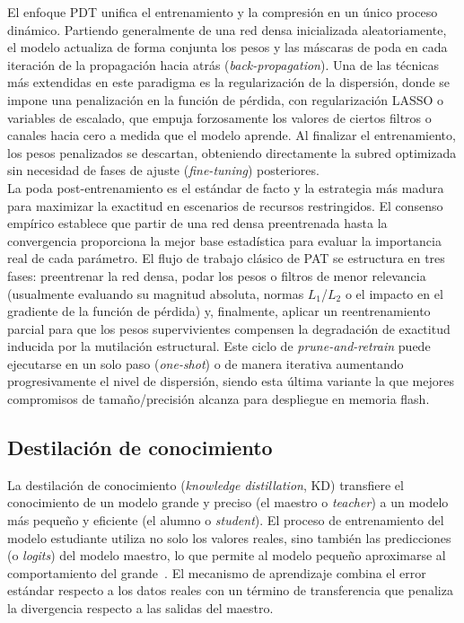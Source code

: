 \documentclass[a4paper,12pt,twoside,final]{book}
\begin{document}
El enfoque PDT unifica el entrenamiento y la compresión en un único proceso dinámico. Partiendo generalmente de una
red densa inicializada aleatoriamente, el modelo actualiza de forma conjunta los pesos y las máscaras de poda en cada
iteración de la propagación hacia atrás (\textit{back-propagation}). Una de las técnicas más extendidas en este
paradigma es la regularización de la dispersión, donde se impone una penalización en la función de pérdida, con
regularización LASSO o variables de escalado, que empuja forzosamente los valores de ciertos filtros o canales hacia
cero a medida que el modelo aprende. Al finalizar el entrenamiento, los pesos penalizados se descartan, obteniendo
directamente la subred optimizada sin necesidad de fases de ajuste (\textit{fine-tuning}) posteriores.\\

La poda post-entrenamiento es el estándar de facto y la estrategia más madura para maximizar la exactitud en
escenarios de recursos restringidos. El consenso empírico establece que partir de una red densa preentrenada hasta
la convergencia proporciona la mejor base estadística para evaluar la importancia real de cada parámetro. El flujo de
trabajo clásico de PAT se estructura en tres fases: preentrenar la red densa, podar los pesos o filtros de menor
relevancia (usualmente evaluando su magnitud absoluta, normas $L_1$/$L_2$ o el impacto en el gradiente de la función
de pérdida) y, finalmente, aplicar un reentrenamiento parcial para que los pesos supervivientes compensen la
degradación de exactitud inducida por la mutilación estructural. Este ciclo de \textit{prune-and-retrain} puede
ejecutarse en un solo paso (\textit{one-shot}) o de manera iterativa aumentando progresivamente el nivel de
dispersión, siendo esta última variante la que mejores compromisos de tamaño/precisión alcanza para despliegue en
memoria flash.

\subsection{Destilación de conocimiento}
La destilación de conocimiento (\textit{knowledge distillation}, KD) transfiere el conocimiento de un modelo grande y
preciso (el maestro o \textit{teacher}) a un modelo más pequeño y eficiente (el alumno o \textit{student}). El
proceso de entrenamiento del modelo estudiante utiliza no solo los valores reales, sino también las predicciones (o
\textit{logits}) del modelo maestro, lo que permite al modelo pequeño aproximarse al comportamiento del
grande~\cite{gou2021ijcv,xu2023ieecomst}. El mecanismo de aprendizaje combina el error estándar respecto a los datos
reales con un término de transferencia que penaliza la divergencia respecto a las salidas del maestro.\\
\end{document}
